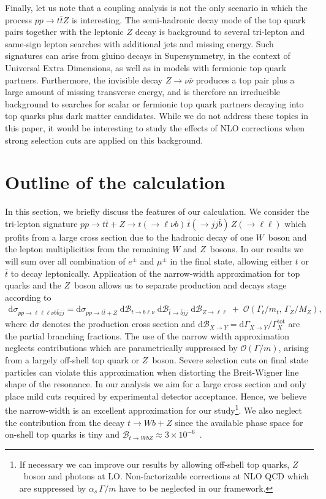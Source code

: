 \documentclass{JHEP3}
\newcommand{\mrm}{\mathrm}
\newcommand{\rd}{\mathrm{d}}
\newcommand{\Br}{\mathcal{B}}
\def\ttbZ{t\bar{t}Z}
\def\ttb{t\bar{t}}
\newcommand{\be}{\begin{eqnarray}}
\newcommand{\ee}{\end{eqnarray}}
\begin{document}
Finally, let us note that a coupling analysis is not the only scenario in which the process $pp\to\ttbZ$ is interesting. 
The semi-hadronic decay mode of the top quark pairs together with the leptonic $Z$ decay is background to several tri-lepton and same-sign lepton searches with additional jets and missing energy.
Such signatures can arise from gluino decays in Supersymmetry, in the context of Universal Extra Dimensions, as well as in models with fermionic top quark partners. 
Furthermore, the invisible decay $Z \to \nu \bar{\nu}$ produces a top pair plus a large amount of missing transverse energy, and is therefore an irreducible background 
to searches for scalar or fermionic top quark partners decaying into top quarks plus dark matter candidates.
While we do not address these topics in this paper, it would be interesting to study the effects of NLO corrections when strong selection cuts are applied on this background.


\section{Outline of the calculation}
In this section, we briefly discuss the features of our calculation.
We consider the tri-lepton signature  
$pp \to \ttb + Z \to t(\to \ell \nu b) \, \bar{t} (\to jj \bar{b}) \, Z(\to \ell \ell)$
which profits from a large cross section due to the hadronic decay of one $W$~boson and the lepton multiplicities from the remaining $W$ and $Z$~bosons.
In our results we will sum over all combination of $e^\pm$ and $\mu^\pm$ in the final state, allowing either $t$ or $\bar t$ to decay leptonically.
Application of the narrow-width approximation for top quarks and the $Z$~boson allows us to separate production and decays stage according to 
\be
  \rd \sigma_{pp\to\ell\ell\ell\nu b \bar{b} jj} = \rd \sigma_{pp\to\ttb+Z} \; \rd\Br_{t\to b \ell\nu} \; \rd\Br_{\bar{t} \to \bar{b} jj} \; \rd\Br_{Z\to \ell\ell}
  \;+\; \mathcal{O}(\Gamma_t/m_t, \, \Gamma_Z/M_Z)
  , \label{Xsec}
\ee
where $\rd \sigma$ denotes the production cross section and $\rd\Br_{X\to Y}= \rd \Gamma_{X\to Y} \big/ \Gamma^\mrm{tot}_X$ are the partial branching fractions.
The use of the narrow width approximation neglects contributions which are parametrically suppressed by $\mathcal{O}(\Gamma / m)$, arising from a largely off-shell top quark or $Z$~boson.
Severe selection cuts on final state particles can violate this approximation when distorting the Breit-Wigner line shape of the resonance.
In our analysis we aim for a large cross section and only place mild cuts required by experimental detector acceptance. 
Hence, we believe the narrow-width is an excellent approximation for our study\footnote{
If necessary we can improve our results by allowing off-shell top quarks, $Z$~boson and photons at LO.
Non-factorizable corrections at NLO QCD which are suppressed by $\alpha_s \, \Gamma/m$ have to be neglected in our framework.
}.
We also neglect the contribution from the decay $t \to Wb+Z$ since the available phase space for on-shell top quarks is tiny and 
$\Br_{t\to W bZ } \approx 3 \times 10^{-6}$~\cite{Altarelli:2000nt,Decker:1992wz,Mahlon:1994us,Jenkins:1996zd}.
\end{document}
